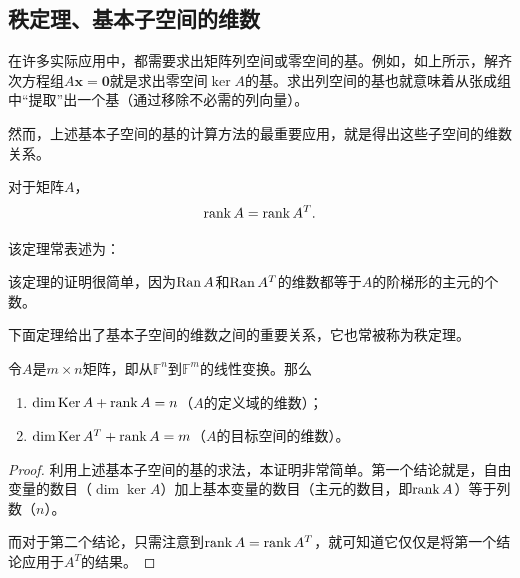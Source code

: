 \subsection{秩定理、基本子空间的维数}

在许多实际应用中，都需要求出矩阵列空间或零空间的基。例如，如上所示，解齐次方程组$A\mathbf{x}=\mathbf{0}$就是求出零空间$\ker A$的基。求出列空间的基也就意味着从张成组中“提取”出一个基（通过移除不必需的列向量）。

然而，上述基本子空间的基的计算方法的最重要应用，就是得出这些子空间的维数关系。

\begin{theorem}[秩定理]\label{thm:rank_theorem}
  对于矩阵$A$，\[\operatorname{rank} A = \operatorname{rank} A^T.\]
\end{theorem}
该定理常表述为：
\begin{center}
\end{center}
该定理的证明很简单，因为$\operatorname{Ran} A$和$\operatorname{Ran} A^T$的维数都等于$A$的阶梯形的主元的个数。

下面定理给出了基本子空间的维数之间的重要关系，它也常被称为秩定理。

\begin{theorem}\label{thm:fundamental_thm_of_la}
  令$A$是$m\times n$矩阵，即从$\mathbb{F}^n$到$\mathbb{F}^m$的线性变换。那么
  \begin{enumerate}
    \item $\dim \operatorname{Ker} A + \operatorname{rank} A = n$（$A$的定义域的维数）；
    \item $\dim \operatorname{Ker} A^T + \operatorname{rank} A = m$（$A$的目标空间的维数）。
  \end{enumerate}
\end{theorem}
\begin{proof}
  利用上述基本子空间的基的求法，本证明非常简单。第一个结论就是，自由变量的数目（$\dim\ker A$）加上基本变量的数目（主元的数目，即$\operatorname{rank} A$）等于列数（$n$）。

  而对于第二个结论，只需注意到$\operatorname{rank} A = \operatorname{rank} A^T$，就可知道它仅仅是将第一个结论应用于$A^T$的结果。
\end{proof}

